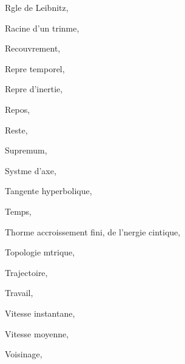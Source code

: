 \documentclass[a4paper,12pt]{book}
\theoremstyle{mes_exemples}	\newtheorem{exemple}[numtho]{Exemple}
\theoremstyle{mes_tho}
\begin{document}
\begin{theindex}
  \indexspace

  \item Rgle de Leibnitz, 
  \item Racine d'un trinme, 
  \item Recouvrement, 
  \item Repre
    \subitem temporel, 
  \item Repre d'inertie, 
  \item Repos, 
  \item Reste, 

  \indexspace

  \item Supremum, 
  \item Systme d'axe, 

  \indexspace

  \item Tangente hyperbolique, 
  \item Temps, 
  \item Thorme
    \subitem accroissement fini, 
    \subitem de l'nergie cintique, 
  \item Topologie
    \subitem mtrique, 
  \item Trajectoire, 
  \item Travail, 

  \indexspace

  \item Vitesse instantane, 
  \item Vitesse moyenne, 
  \item Voisinage, 

\end{theindex}
\end{document}
